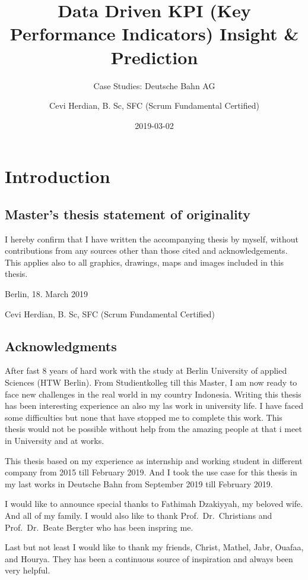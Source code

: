 \documentclass[]{book}
\title{Data Driven KPI (Key Performance Indicators) Insight \& Prediction}
\subtitle{Case Studies: Deutsche Bahn AG}
\author{Cevi Herdian, B. Sc, SFC (Scrum Fundamental Certified)}
\date{2019-03-02}
\begin{document}
\maketitle

{
\setcounter{tocdepth}{1}
\tableofcontents
}
\chapter{Introduction}\label{introduction}

\section{Master's thesis statement of
originality}\label{masters-thesis-statement-of-originality}

I hereby confirm that I have written the accompanying thesis by myself,
without contributions from any sources other than those cited and
acknowledgements. This applies also to all graphics, drawings, maps and
images included in this thesis.

Berlin, 18. March 2019

Cevi Herdian, B. Sc, SFC (Scrum Fundamental Certified)

\section{Acknowledgments}\label{acknowledgments}

After fast 8 years of hard work with the study at Berlin University of
applied Sciences (HTW Berlin). From Studientkolleg till this Master, I
am now ready to face new challenges in the real world in my country
Indonesia. Writing this thesis has been interesting experience an also
my las work in university life. I have faced some difficulties but none
that have stopped me to complete this work. This thesis would not be
possible without help from the amazing people at that i meet in
University and at works.

This thesis based on my experience as internship and working student in
different company from 2015 till February 2019. And I took the use case
for this thesis in my last works in Deutsche Bahn from September 2019
till February 2019.

I would like to announce special thanks to Fathimah Dzakiyyah, my
beloved wife. And all of my family. I would also like to thank
Prof.~Dr.~Christians and Prof.~Dr.~Beate Bergter who has been inspring
me.

Last but not least I would like to thank my friends, Christ, Mathel,
Jabr, Ouafaa, and Hourya. They has been a continuous source of
inspiration and always been very helpful.
\end{document}
